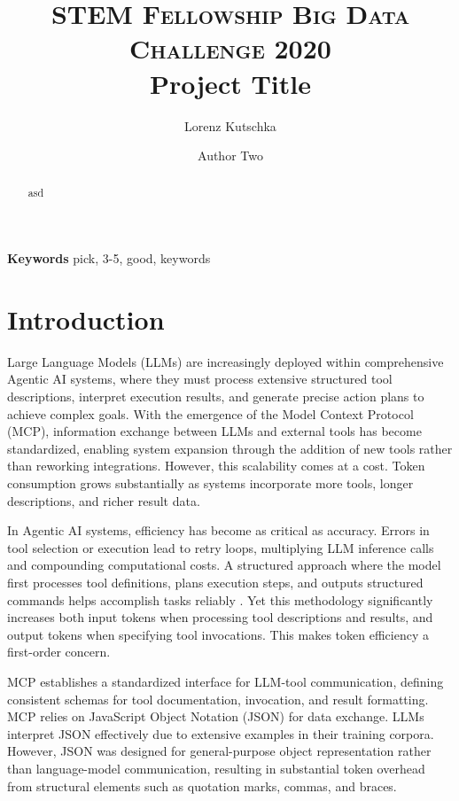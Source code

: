 \documentclass[10pt,twocolumn,letterpaper]{article}
\title{
		\usefont{OT1}{bch}{b}{n}
		\normalfont \normalsize \textsc{STEM Fellowship Big Data Challenge 2020} \\ [10pt]
		\huge Project Title \\
}
\author[1]{Lorenz Kutschka}
\author[1]{Author Two}
\affil[1]{High School 1}
\affil[2]{High School 2}
\begin{document}
\maketitle

\begin{abstract}
asd
\end{abstract} 

{\textbf{Keywords} 
pick, 3-5, good, keywords}

\section{Introduction}
\label{sec:introduction}
Large Language Models (LLMs) are increasingly deployed within comprehensive Agentic AI systems, where they must process extensive structured tool descriptions, interpret execution results, and generate precise action plans to achieve complex goals. With the emergence of the Model Context Protocol (MCP), information exchange between LLMs and external tools has become standardized, enabling system expansion through the addition of new tools rather than reworking integrations. However, this scalability comes at a cost. Token consumption grows substantially as systems incorporate more tools, longer descriptions, and richer result data.

In Agentic AI systems, efficiency has become as critical as accuracy. Errors in tool selection or execution lead to retry loops, multiplying LLM inference calls and compounding computational costs. A structured approach where the model first processes tool definitions, plans execution steps, and outputs structured commands helps accomplish tasks reliably \citep{Ro_Qiu_Goiri_Fonseca_Bianchini_Akella_Wang_Erez_Choukse_2025}. Yet this methodology significantly increases both input tokens when processing tool descriptions and results, and output tokens when specifying tool invocations. This makes token efficiency a first-order concern.

MCP establishes a standardized interface for LLM-tool communication, defining consistent schemas for tool documentation, invocation, and result formatting. MCP relies on JavaScript Object Notation (JSON) \citep{Bourhis_Reutter_Suárez_Vrgoč_2017} for data exchange. LLMs interpret JSON effectively due to extensive examples in their training corpora. However, JSON was designed for general-purpose object representation rather than language-model communication, resulting in substantial token overhead from structural elements such as quotation marks, commas, and braces.
\end{document}
